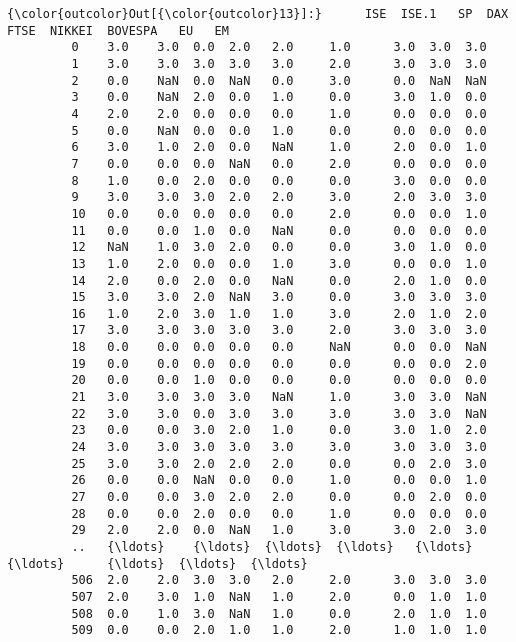 \documentclass[11pt]{article}
\begin{document}
\begin{Verbatim}[commandchars=\\\{\}]
{\color{outcolor}Out[{\color{outcolor}13}]:}      ISE  ISE.1   SP  DAX  FTSE  NIKKEI  BOVESPA   EU   EM
         0    3.0    3.0  0.0  2.0   2.0     1.0      3.0  3.0  3.0
         1    3.0    3.0  3.0  3.0   3.0     2.0      3.0  3.0  3.0
         2    0.0    NaN  0.0  NaN   0.0     3.0      0.0  NaN  NaN
         3    0.0    NaN  2.0  0.0   1.0     0.0      3.0  1.0  0.0
         4    2.0    2.0  0.0  0.0   0.0     1.0      0.0  0.0  0.0
         5    0.0    NaN  0.0  0.0   1.0     0.0      0.0  0.0  0.0
         6    3.0    1.0  2.0  0.0   NaN     1.0      2.0  0.0  1.0
         7    0.0    0.0  0.0  NaN   0.0     2.0      0.0  0.0  0.0
         8    1.0    0.0  2.0  0.0   0.0     0.0      3.0  0.0  0.0
         9    3.0    3.0  3.0  2.0   2.0     3.0      2.0  3.0  3.0
         10   0.0    0.0  0.0  0.0   0.0     2.0      0.0  0.0  1.0
         11   0.0    0.0  1.0  0.0   NaN     0.0      0.0  0.0  0.0
         12   NaN    1.0  3.0  2.0   0.0     0.0      3.0  1.0  0.0
         13   1.0    2.0  0.0  0.0   1.0     3.0      0.0  0.0  1.0
         14   2.0    0.0  2.0  0.0   NaN     0.0      2.0  1.0  0.0
         15   3.0    3.0  2.0  NaN   3.0     0.0      3.0  3.0  3.0
         16   1.0    2.0  3.0  1.0   1.0     3.0      2.0  1.0  2.0
         17   3.0    3.0  3.0  3.0   3.0     2.0      3.0  3.0  3.0
         18   0.0    0.0  0.0  0.0   0.0     NaN      0.0  0.0  NaN
         19   0.0    0.0  0.0  0.0   0.0     0.0      0.0  0.0  2.0
         20   0.0    0.0  1.0  0.0   0.0     0.0      0.0  0.0  0.0
         21   3.0    3.0  3.0  3.0   NaN     1.0      3.0  3.0  NaN
         22   3.0    3.0  0.0  3.0   3.0     3.0      3.0  3.0  NaN
         23   0.0    0.0  3.0  2.0   1.0     0.0      3.0  1.0  2.0
         24   3.0    3.0  3.0  3.0   3.0     3.0      3.0  3.0  3.0
         25   3.0    3.0  2.0  2.0   2.0     0.0      0.0  2.0  3.0
         26   0.0    0.0  NaN  0.0   0.0     1.0      0.0  0.0  1.0
         27   0.0    0.0  3.0  2.0   2.0     0.0      0.0  2.0  0.0
         28   0.0    0.0  2.0  0.0   0.0     1.0      0.0  0.0  0.0
         29   2.0    2.0  0.0  NaN   1.0     3.0      3.0  2.0  3.0
         ..   {\ldots}    {\ldots}  {\ldots}  {\ldots}   {\ldots}     {\ldots}      {\ldots}  {\ldots}  {\ldots}
         506  2.0    2.0  3.0  3.0   2.0     2.0      3.0  3.0  3.0
         507  2.0    3.0  1.0  NaN   1.0     2.0      0.0  1.0  1.0
         508  0.0    1.0  3.0  NaN   1.0     0.0      2.0  1.0  1.0
         509  0.0    0.0  2.0  1.0   1.0     2.0      1.0  1.0  1.0

\end{Verbatim}
\end{document}
